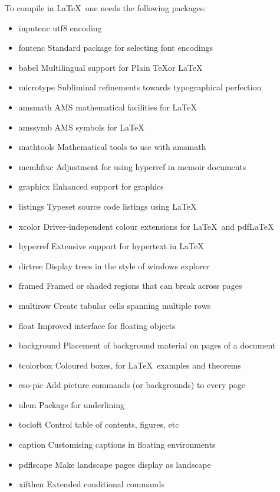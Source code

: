 To compile in \LaTeX\, one needs the following packages:
\begin{itemize}
	\item inputenc \dotfill utf8 encoding
	\item fontenc \dotfill Standard package for selecting font encodings
	\item babel \dotfill Multilingual support for Plain \TeX or \LaTeX
	\item microtype \dotfill Sublim­i­nal re­fine­ments to­wards ty­po­graph­i­cal per­fec­tion
	\item amsmath \dotfill AMS mathematical facilities for \LaTeX
	\item amssymb \dotfill AMS symbols for \LaTeX
	\item mathtools \dotfill Mathematical tools to use with amsmath
	\item memhfixc \dotfill Adjustment for using hyperref in memoir documents
	\item graphicx \dotfill Enhanced support for graphics
	\item listings \dotfill Typeset source code listings using \LaTeX
	\item xcolor \dotfill Driver-independent colour extensions for \LaTeX\, and pdf\LaTeX
	\item hyperref \dotfill Extensive support for hypertext in \LaTeX
	\item dirtree \dotfill Display trees in the style of windows explorer
	\item framed \dotfill Framed or shaded regions that can break across pages
	\item multirow \dotfill Create tabular cells spanning multiple rows
	\item float \dotfill Improved interface for floating objects
	\item background \dotfill Placement of background material on pages of a document
	\item tcolorbox \dotfill Coloured boxes, for \LaTeX\, examples and theorems
	\item eso-pic \dotfill Add picture commands (or backgrounds) to every page
	\item ulem \dotfill Package for underlining
	\item tocloft \dotfill Con­trol ta­ble of con­tents, fig­ures, etc
	\item caption \dotfill Cus­tomis­ing cap­tions in float­ing en­vi­ron­ments
	\item pdflscape \dotfill Make land­scape pages dis­play as land­scape
	\item xifthen \dotfill Ex­tended con­di­tional com­mands
\end{itemize}



